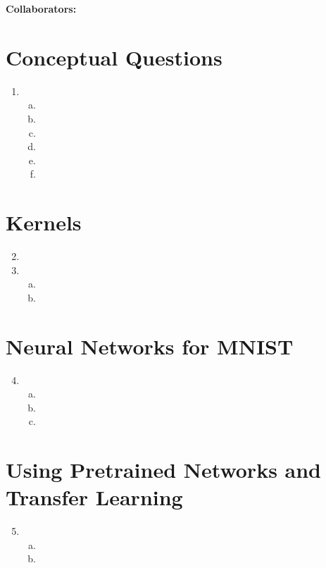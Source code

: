 \documentclass{article}
\newcommand{\1}[1]{\mathbf{1}\left\{#1\right\}}
\begin{document}
\textbf{Collaborators:}
\section*{Conceptual Questions}
\begin{enumerate}[1.]
\item \begin{enumerate}[a.]
      \item
      \item
      \item
      \item
      \item
      \item
      \end{enumerate}
\end{enumerate}

\section*{Kernels}
\begin{enumerate}[1.]
\setcounter{enumi}{1}
\item
\item \begin{enumerate}[a.]
      \item
      \item
      \end{enumerate}
\end{enumerate}

\section*{Neural Networks for MNIST}
\begin{enumerate}[1.]
\setcounter{enumi}{3}
\item \begin{enumerate}[a.]
      \item
      \item
      \item
      \end{enumerate}
\end{enumerate}

\section*{Using Pretrained Networks and Transfer Learning}
\begin{enumerate}[1.]
\setcounter{enumi}{4}
\item \begin{enumerate}[a.]
      \item
      \item
      \end{enumerate}
\end{enumerate}
\end{document}
